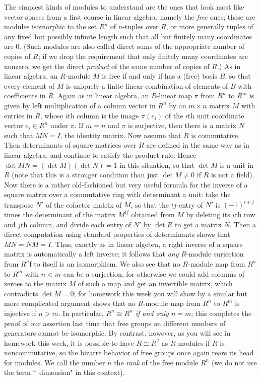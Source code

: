 \documentclass[10pt]{article}
\begin{document}
The simplest kinds of modules to understand are the ones that look most
like vector spaces from a first course in linear algebra, namely the
{\sl free} ones; these are modules isomorphic to the set $R^n$ of
$n$-tuples over $R$, or more generally tuples of any fixed but possibly
infinite length such that all but finitely many coordinates are 0. (Such
modules are also called direct sums of the appropriate number of copies
of $R$; if we drop the requirement that only finitely many coordinates
are nonzero, we get the direct {\sl product} of the same number of
copies of $R$.) As in linear algebra, an $R$-module $M$ is free if and
only if has a (free) basis $B$, so that every element of $M$ is uniquely
a finite linear combination of elements of $B$ with coefficients in $R$.
Again as in linear algebra, an $R$-linear map $\pi$ from $R^n$ to $R^m$
is given by left multiplication of a column vector in $R^n$ by an
$m\times n$ matrix $M$ with entries in $R$, whose $i$th column is the
image $\pi(e_i)$ of the $i$th unit coordinate vector $e_i\in R^n$ under
$\pi$. If $m=n$ and $\pi$ is surjective, then there is a matrix $N$ such
that $MN = I$, the identity matrix. Now assume that $R$ is commutative.
Then determinants of square matrices over $R$ are defined in the same
way as in linear algebra, and continue to satisfy the product rule.
Hence $\det MN =(\det M)(\det N) = 1$ in this situation, so that $\det
M$ is a unit in $R$ (note that this is a stronger condition than just
$\det M\ne0$ if $R$ is not a field). Now there is a rather old-fashioned
but very useful formula for the inverse of a square matrix over a
commutative ring with determinant a unit: take the transpose $N'$ of the
cofactor matrix of $M$, so that the $ij$-entry of $N'$ is $(-1)^{i+j}$
times the determinant of the matrix $M^{ij}$ obtained from $M$ by
deleting its $i$th row and $j$th column, and divide each entry of $N'$
by $\det R$ to get a matrix $N$. Then a direct computation using
standard properties of determinants shows that $MN = NM = I$. Thus,
exactly as in linear algebra, a right inverse of a square matrix is
automatically a left inverse; it follows that {\sl any} $R$-module
surjection from $R^n$f to itself is an isomorphism. We also see that no
$R$-module map from $R^n$ to $R^m$ with $n<m$ can be a surjection, for
otherwise we could add columns of zeroes to the matrix $M$ of such a map
and get an invertible matrix, which contradicts $\det M=0$; for homework
this week you will show by a similar but more complicated argument shows
that no $R$-module map from $R^n$ to $R^m$ is injective if $n>m$. In
particular, {\sl $R^n \cong R^n$ if and only $n=m$}; this completes the
proof of our assertion last time that free groups on different numbers
of generators cannot be isomorphic. By contrast, however, as you will
see in homework this week, it is possible to have $R\cong R^2$ as
$R$-modules if $R$ is noncommutative, so the bizarre behavior of free
groups once again rears its head for modules. We call the number $n$ the
{\sl rank} of the free module $R^n$ (we do not use the term \lq\lq
dimension" in this context).
\end{document}
